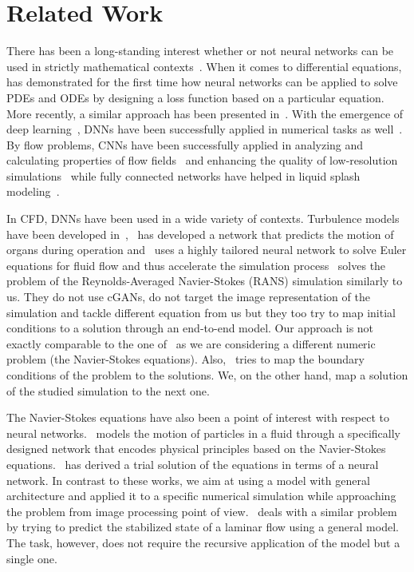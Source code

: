 \documentclass{llncs}
\begin{document}
\section{Related Work}\label{related_work}
There has been a long-standing interest whether or not neural networks can be used in strictly mathematical contexts~\cite{neville2002,lample2019}. When it comes to differential equations,~\cite{lagaris1998} has demonstrated for the first time how neural networks can be applied to solve PDEs and ODEs by designing a loss function based on a particular equation. More recently, a similar approach has been presented in~\cite{avrutskiy2017}. With the emergence of deep learning~\cite{krizhevsky2012}, DNNs have been successfully applied in numerical tasks as well~\cite{wei2017,battaglia2016}. By flow problems, CNNs have been successfully applied in analyzing and calculating properties of flow fields~\cite{georgiou2018} and enhancing the quality of low-resolution simulations~\cite{tempoGan} while fully connected networks have helped in liquid splash modeling~\cite{hu2017}. 

In CFD, DNNs have been used in a wide variety of contexts. Turbulence models have been developed in~\cite{beck2018},~\cite{pfeiffer2019} has developed a network that predicts the motion of organs during operation and~\cite{tompson2016} uses a highly tailored neural network to solve Euler equations for fluid flow and thus accelerate the simulation process~\cite{thuerey2018} solves the problem of the Reynolds-Averaged Navier-Stokes (RANS) simulation similarly to us. They do not use cGANs, do not target the image representation of the simulation and tackle different equation from us but they too try to map initial conditions to a solution through an end-to-end model. Our approach is not exactly comparable to the one of~\cite{thuerey2018} as we are considering a different numeric problem (the Navier-Stokes equations). Also,~\cite{thuerey2018} tries to map the boundary conditions of the problem to the solutions. We, on the other hand, map a solution of the studied simulation to the next one.

The Navier-Stokes equations have also been a point of interest with respect to neural networks.~\cite{raissi2018} models the motion of particles in a fluid through a specifically designed network that encodes physical principles based on the Navier-Stokes equations.~\cite{baymani2010} has derived a trial solution of the equations in terms of a neural network. In contrast to these works, we aim at using a model with general architecture and applied it to a specific numerical simulation while approaching the problem from image processing point of view.~\cite{guo2016} deals with a similar problem by trying to predict the stabilized state of a laminar flow using a general model. The task, however, does not require the recursive application of the model but a single one.
\end{document}

